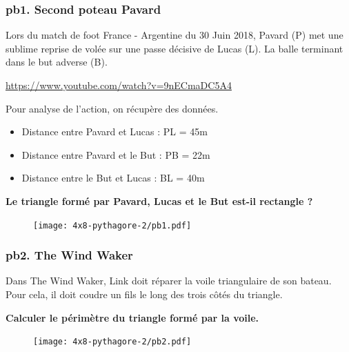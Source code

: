 \newpage

\subsubsection*{pb1. Second poteau Pavard} 

\begin{multicols}{2}

Lors du match de foot France - Argentine du 30 Juin 2018, Pavard (P) met une sublime reprise de volée sur une passe décisive de Lucas (L). La balle terminant dans le but adverse (B).

\url{https://www.youtube.com/watch?v=9nECmaDC5A4}

Pour analyse de l'action, on récupère des données. 

\begin{itemize}
  \item Distance entre Pavard et Lucas : PL = 45m
  \item Distance entre Pavard et le But : PB = 22m
  \item Distance entre le But et Lucas : BL = 40m
\end{itemize}

\textbf{Le triangle formé par Pavard, Lucas et le But est-il rectangle ?} \columnbreak

\begin{figure}[H]
  \centering
  \texttt{[image: 4x8-pythagore-2/pb1.pdf]}
\end{figure}

\end{multicols}

\Pointilles[10]

\begin{multicols}{2}

\subsubsection*{pb2. The Wind Waker} 

Dans The Wind Waker, Link doit réparer la voile triangulaire de son bateau. Pour cela, il doit coudre un fils le long des trois côtés du triangle. 

\textbf{Calculer le périmètre du triangle formé par la voile.} 

\Pointilles[9] \columnbreak

\begin{figure}[H]
  \centering
  \texttt{[image: 4x8-pythagore-2/pb2.pdf]}
\end{figure}

\end{multicols}

\Pointilles[7]

